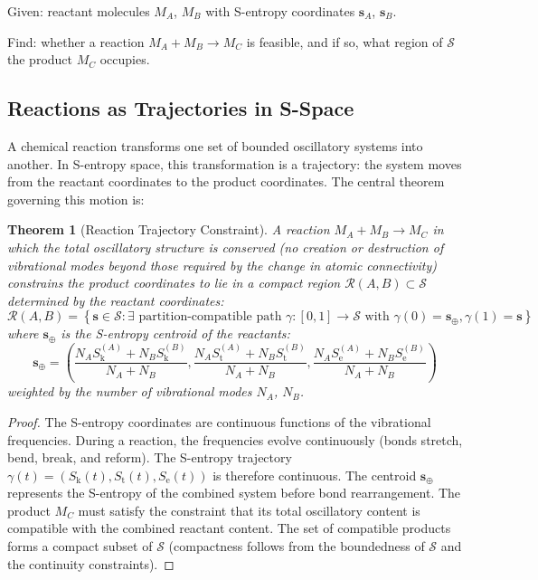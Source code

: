 \documentclass[11pt,twocolumn,a4paper]{article}
\newtheorem{theorem}{Theorem}[section]
\theoremstyle{definition}
\theoremstyle{remark}
\newcommand{\Sk}{S_{\mathrm{k}}}
\newcommand{\St}{S_{\mathrm{t}}}
\newcommand{\Se}{S_{\mathrm{e}}}
\newcommand{\Sspace}{\mathcal{S}}
\begin{document}
Given: reactant molecules $M_A$, $M_B$ with S-entropy coordinates $\mathbf{s}_A$, $\mathbf{s}_B$.

Find: whether a reaction $M_A + M_B \to M_C$ is feasible, and if so, what region of $\Sspace$ the product $M_C$ occupies.

\subsection{Reactions as Trajectories in S-Space}

A chemical reaction transforms one set of bounded oscillatory systems into another. In S-entropy space, this transformation is a trajectory: the system moves from the reactant coordinates to the product coordinates. The central theorem governing this motion is:

\begin{theorem}[Reaction Trajectory Constraint]
\label{thm:reaction_trajectory}
A reaction $M_A + M_B \to M_C$ in which the total oscillatory structure is conserved (no creation or destruction of vibrational modes beyond those required by the change in atomic connectivity) constrains the product coordinates to lie in a compact region $\mathcal{R}(A, B) \subset \Sspace$ determined by the reactant coordinates:
\begin{equation}
\mathcal{R}(A, B) = \left\{ \mathbf{s} \in \Sspace : \exists \text{ partition-compatible path } \gamma: [0,1] \to \Sspace \text{ with } \gamma(0) = \mathbf{s}_{\oplus}, \gamma(1) = \mathbf{s} \right\}
\label{eq:reaction_region}
\end{equation}
where $\mathbf{s}_{\oplus}$ is the S-entropy centroid of the reactants:
\begin{equation}
\mathbf{s}_{\oplus} = \left( \frac{N_A \Sk^{(A)} + N_B \Sk^{(B)}}{N_A + N_B}, \frac{N_A \St^{(A)} + N_B \St^{(B)}}{N_A + N_B}, \frac{N_A \Se^{(A)} + N_B \Se^{(B)}}{N_A + N_B} \right)
\label{eq:centroid}
\end{equation}
weighted by the number of vibrational modes $N_A$, $N_B$.
\end{theorem}

\begin{proof}
The S-entropy coordinates are continuous functions of the vibrational frequencies. During a reaction, the frequencies evolve continuously (bonds stretch, bend, break, and reform). The S-entropy trajectory $\gamma(t) = (\Sk(t), \St(t), \Se(t))$ is therefore continuous. The centroid $\mathbf{s}_{\oplus}$ represents the S-entropy of the combined system before bond rearrangement. The product $M_C$ must satisfy the constraint that its total oscillatory content is compatible with the combined reactant content. The set of compatible products forms a compact subset of $\Sspace$ (compactness follows from the boundedness of $\Sspace$ and the continuity constraints).
\end{proof}
\end{document}
